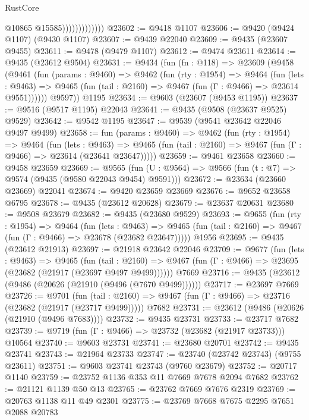 \begin{lexlean}{RustCore}
\begin{coremodule}
                              @10865
                              @15585)))))))))))))
@23602 := @9418 @1107
@23606 := @9420 (@9424 @1107) (@9430 @1107)
@23607 := @9439 @22040
@23609 := @9435 (@23607 @9455)
@23611 := @9478 (@9479 @1107)
@23612 := @9474 @23611
@23614 := @9435 (@23612 @9504)
@23631 := @9434
    (fun (fn : @118) =>
    @23609
      (@9458
        (@9461
          (fun (params : @9460) =>
          @9462
            (fun (rty : @1954) =>
            @9464
              (fun (lets : @9463) =>
              @9465 (fun (tail : @2160) => @9467 (fun (Γ : @9466) => @23614 @9551))))))
        @9597))
    @1195
@23634 := @9603 (@23607 (@9453 @1195))
@23637 := @9516 (@9517 @1195) @22043
@23641 := @9435 (@9508 (@23637 @9525) @9529)
@23642 := @9542 @1195
@23647 := @9539 (@9541 @23642 @22046 @9497 @9499)
@23658 := fun (params : @9460) =>
  @9462
    (fun (rty : @1954) =>
    @9464
      (fun (lets : @9463) =>
      @9465 (fun (tail : @2160) => @9467 (fun (Γ : @9466) => @23614 (@23641 @23647)))))
@23659 := @9461 @23658
@23660 := @9458 @23659
@23669 := @9565
    (fun (U : @9564) => @9566 (fun (t : @7) => @9574 (@9435 (@9580 @22043 @9454) @9591)))
@23672 := @23634 (@23660 @23669) @22041
@23674 := @9420 @23659 @23669
@23676 := @9652 @23658 @6795
@23678 := @9435 (@23612 @20628)
@23679 := @23637 @20631
@23680 := @9508 @23679
@23682 := @9435 (@23680 @9529)
@23693 := @9655
    (fun (rty : @1954) =>
    @9464
      (fun (lets : @9463) =>
      @9465 (fun (tail : @2160) => @9467 (fun (Γ : @9466) => @23678 (@23682 @23647)))))
    @1956
@23695 := @9435 (@23612 @21913)
@23697 := @21918 @23642 @22046
@23709 := @9677
    (fun (lets : @9463) =>
    @9465
      (fun (tail : @2160) =>
      @9467 (fun (Γ : @9466) => @23695 (@23682 (@21917 (@23697 @9497 @9499))))))
    @7669
@23716 := @9435 (@23612 (@9486 (@20626 (@21910 (@9496 (@7670 @9499))))))
@23717 := @23697 @7669
@23726 := @9701
    (fun (tail : @2160) => @9467 (fun (Γ : @9466) => @23716 (@23682 (@21917 (@23717 @9499)))))
    @7682
@23731 := @23612 (@9486 (@20626 (@21910 (@9496 @7683))))
@23732 := @9435 @23731
@23733 := @23717 @7682
@23739 := @9719 (fun (Γ : @9466) => @23732 (@23682 (@21917 @23733))) @10564
@23740 := @9603 @23731
@23741 := @23680 @20701
@23742 := @9435 @23741
@23743 := @21964 @23733
@23747 := @23740 (@23742 @23743) (@9755 @23611)
@23751 := @9603 @23741 @23743 (@9760 @23679)
@23752 := @20717 @1140
@23759 := @23752 @1136 @353 @11 @7669 @7678 @2094 @7682
@23762 := @21121 @1139 @50 @13
@23765 := @23762 @7669 @7676 @2319
@23769 := @20763 @1138 @11 @49 @2301
@23775 := @23769 @7668 @7675 @2295 @7651 @2088 @20783

\end{coremodule}
\end{lexlean}
